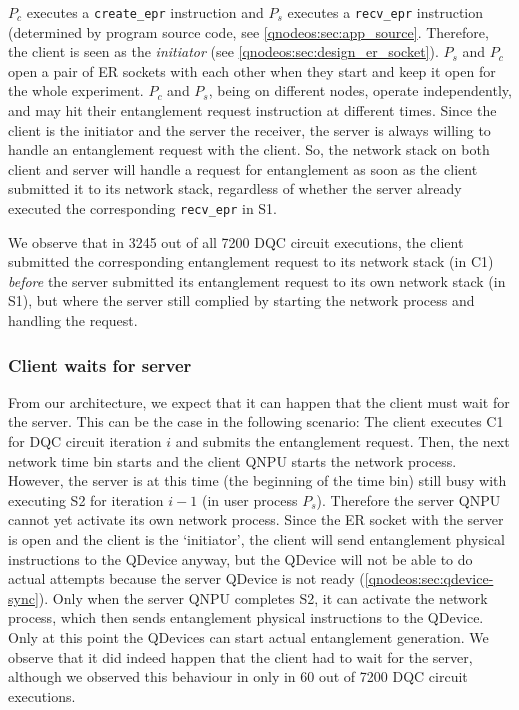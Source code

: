 $P_c$ executes a \texttt{create\_epr} instruction and $P_s$ executes a \texttt{recv\_epr} instruction (determined by program source code, see \cref{qnodeos:sec:app_source}. Therefore, the client is seen as the \emph{initiator} (see \cref{qnodeos:sec:design_er_socket}). $P_s$ and $P_c$ open a pair of \ac{ER} sockets with each other when they start and keep it open for the whole experiment. $P_c$ and $P_s$, being on different nodes, operate independently, and may hit their entanglement request instruction at different times. Since the client is the initiator and the server the receiver, the server is always willing to handle an entanglement request with the client. So, the network stack on both client and server will handle a request for entanglement as soon as the client submitted it to its network stack, regardless of whether the server already executed the corresponding \texttt{recv\_epr} in S1.

We observe that in 3245 out of all 7200 \ac{DQC} circuit executions, the client submitted the corresponding entanglement request to its network stack (in C1) \textit{before} the server submitted its entanglement request to its own network stack (in S1), but where the server still complied by starting the network process and handling the request.

\subsubsection{Client waits for server}

From our architecture, we expect that it can happen that the client must wait for the server. This can be the case in the following scenario: The client executes C1 for \ac{DQC} circuit iteration $i$ and submits the entanglement request. Then, the next network time bin starts and the client \ac{QNPU} starts the network process. However, the server is at this time (the beginning of the time bin) still busy with executing S2 for iteration $i-1$ (in user process $P_s$). Therefore the server \ac{QNPU} cannot yet activate its own network process. Since the \ac{ER} socket with the server is open and the client is the `initiator', the client will send entanglement physical instructions to the \ac{QDevice} anyway, but the \ac{QDevice} will not be able to do actual attempts because the server \ac{QDevice} is not ready (\cref{qnodeos:sec:qdevice-sync}). Only when the server \ac{QNPU} completes S2, it can activate the network process, which then sends entanglement physical instructions to the \ac{QDevice}. Only at this point the \acp{QDevice} can start actual entanglement generation. We observe that it did indeed happen that the client had to wait for the server, although we observed this behaviour in only in 60 out of 7200 \ac{DQC} circuit executions.

